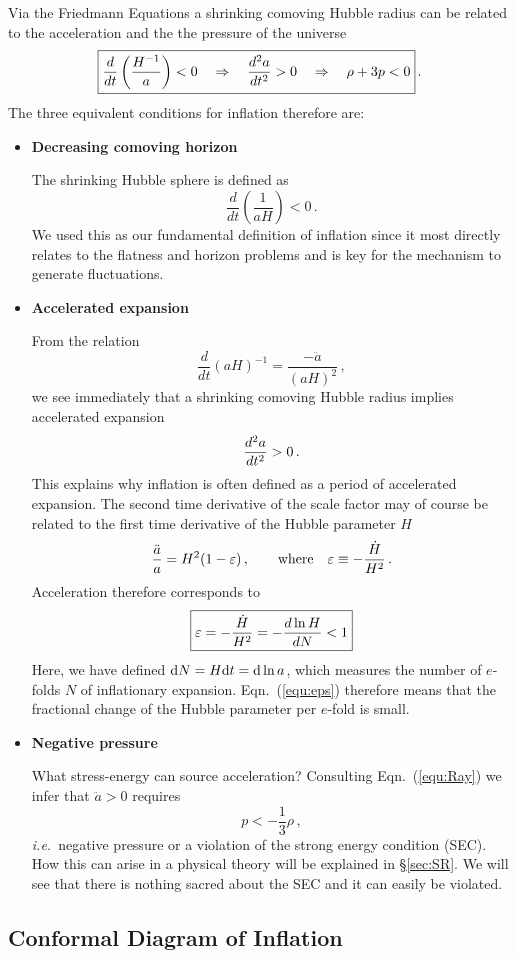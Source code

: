 \documentclass[12pt,letterpaper,rotate]{article}
\def\beq{\begin{equation}}
\def\eeq{\end{equation}}
\def\d{{\rm d}}
\begin{document}
{Via the Friedmann Equations a shrinking comoving Hubble radius can be related to the acceleration and the the pressure of the universe
\beq
\fbox{$\displaystyle
\frac{d}{d t} \left(\frac{H^{-1}}{a}\right) < 0 \quad \Rightarrow \quad {d^2 a \over d t^2} >0 \quad \Rightarrow \quad \rho+3p <0 $}\, .
\eeq
The three equivalent conditions for inflation therefore are:
\begin{itemize}
\item {\bf Decreasing comoving horizon }

The shrinking Hubble sphere is defined as
\beq
\frac{d}{d t} \left(\frac{1}{aH}\right) < 0\, .
\eeq
We used this as our fundamental definition of inflation since it most directly relates to the flatness and horizon problems and is key for the mechanism to generate fluctuations.

\item {\bf Accelerated expansion}

From the relation
\beq
\frac{d}{d t} (a H)^{-1} = \frac{- \ddot a}{(a H)^2}\, ,
\eeq
we see immediately that a shrinking comoving Hubble radius implies accelerated expansion
\beq
{d^2 a \over d t^2 } >0\, . 
\eeq
This explains why inflation is often defined as a period of accelerated expansion.
The second time derivative of the scale factor may of course be related  to the first time derivative of the Hubble parameter $H$
\beq
\frac{\ddot a}{a} = H^2 (1-\varepsilon)\, , \qquad {\rm where} \quad \varepsilon \equiv  - \frac{\dot H}{H^2}\, .
\eeq
Acceleration therefore corresponds to 
\beq
\label{equ:eps}
\fbox{$\displaystyle
\varepsilon = - \frac{\dot H}{H^2} = - \frac{d \ln H}{d N}< 1 $}
\eeq
Here, we have defined $\d N = H \d t = \d \ln a$, which measures the number of $e$-folds $N$ of inflationary expansion.
Eqn.~(\ref{equ:eps}) therefore means that the fractional change of the Hubble parameter per $e$-fold is small.

 
\item {\bf Negative pressure}

What stress-energy can source acceleration?
Consulting 
Eqn.~(\ref{equ:Ray}) we infer that $\ddot a > 0$ requires
\beq
p < - \frac{1}{3} \rho\, ,
\eeq
{\it i.e.}~negative pressure or a
violation of the strong energy condition (SEC). 
How this can arise in a physical theory will be explained in \S\ref{sec:SR}.
We will see that there is nothing sacred about the SEC and it can easily be violated.
\end{itemize}


\subsection{Conformal Diagram of Inflation}

}
\end{document}
